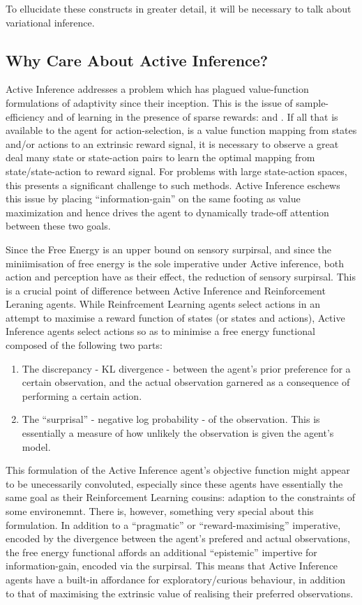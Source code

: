 \documentclass[onecolumn]{IEEEtran}
\begin{document}
To ellucidate these constructs in greater detail, it will be necessary to talk about variational inference.

\subsection{Why Care About Active Inference?}

Active Inference addresses a problem which has plagued value-function formulations of adaptivity since their inception. This is the issue of sample-efficiency and of learning in the presence of sparse rewards: \textcite{RLflawed} and \textcite{RL-Real-World-Challenges}. If all that is available to the agent for action-selection, is a value function mapping from states and/or actions to an extrinsic reward signal, it is necessary to observe a great deal many state or state-action pairs to learn the optimal mapping from state/state-action to reward signal. For problems with large state-action spaces, this presents a significant challenge to such methods. Active Inference eschews this issue by placing ``information-gain'' on the same footing as value maximization and hence drives the agent to dynamically trade-off attention between these two goals. 

Since the Free Energy is an upper bound on sensory surpirsal, and since the miniimisation of free energy is the sole imperative under Active inference, both action and perception have as their effect, the reduction of sensory surpirsal. This is a crucial point of difference between Active Inference and Reinforcement Leraning agents. While Reinfrcement Learning agents select actions in an attempt to maximise a reward function of states (or states and actions), Active Inference agents select actions so as to minimise a free energy functional composed of the following two parts: 

\begin{enumerate}
	\item The discrepancy - KL divergence - between the agent's prior preference for a certain observation, and the actual observation garnered as a consequence of performing a certain action.
	\item The ``surprisal'' - negative log probability - of the observation. This is essentially a measure of how unlikely the observation is given the agent's model.
\end{enumerate}

This formulation of the Active Inference agent's objective function might appear to be unecessarily convoluted, especially since these agents have essentially the same goal as their Reinforcement Learning cousins: adaption to the constraints of some environemnt. There is, however, something very special about this formulation. In addition to a ``pragmatic'' or ``reward-maximising'' imperative, encoded by the divergence between the agent's prefered and actual observations, the free energy functional affords an additional ``epistemic'' impertive for information-gain, encoded via the surpirsal. This means that Active Inference agents have a built-in affordance for exploratory/curious behaviour, in addition to that of maximising the extrinsic value of realising their preferred observations.
\end{document}
